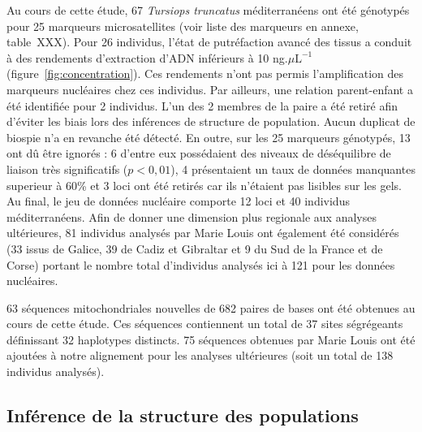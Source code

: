 \documentclass[a4paper,12pt,twoside]{article}\usepackage[]{graphicx}\usepackage[]{color}
\begin{document}
Au cours de cette étude, 67 \emph{Tursiops truncatus} méditerranéens ont été génotypés pour 25 marqueurs microsatellites (voir liste des marqueurs en annexe, table~XXX). Pour 26 individus, l'état de putréfaction avancé des tissus a conduit à des rendements d'extraction d'ADN inférieurs à 10 ng$.\mu \textrm{L}^{-1}$ (figure~\ref{fig:concentration}). Ces rendements n'ont pas permis l'amplification des marqueurs nucléaires chez ces individus. Par ailleurs, une relation parent-enfant a été identifiée pour 2 individus. L'un des 2 membres de la paire a été retiré afin d'éviter les biais lors des inférences de structure de population. Aucun duplicat de biospie n'a en revanche été détecté.
En outre, sur les 25 marqueurs génotypés, 13 ont dû être ignorés : 6 d'entre eux possédaient des niveaux de déséquilibre de liaison très significatifs ($p<0,01$), 4 présentaient un taux de données manquantes superieur à 60\% et 3 loci ont été retirés car ils n'étaient pas lisibles sur les gels. Au final, le jeu de données nucléaire comporte 12 loci et 40 individus méditerranéens. Afin de donner une dimension plus regionale aux analyses ultérieures, 81 individus analysés par Marie Louis \citep{phdLouis2014} ont également été considérés (33 issus de Galice, 39 de Cadiz et Gibraltar et 9 du Sud de la France et de Corse) portant le nombre total d'individus analysés ici à 121 pour les données nucléaires.

63 séquences mitochondriales nouvelles de 682 paires de bases ont été obtenues au cours de cette étude. Ces séquences contiennent un total de 37 sites ségrégeants définissant 32 haplotypes distincts. 75 séquences obtenues par Marie Louis ont été ajoutées à notre alignement pour les analyses ultérieures (soit un total de 138 individus analysés).

\subsection{Inférence de la structure des populations}

\end{document}
